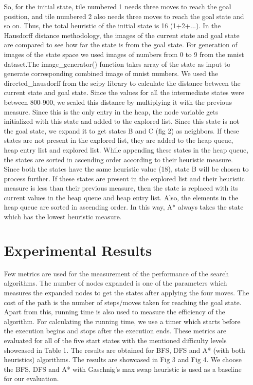 \documentclass{svproc}
\begin{document}
\noindent So, for the initial state, tile numbered 1 needs three moves to reach the goal position, and tile numbered 2 also needs three moves to reach the goal state and so on. Thus, the total heuristic of the initial state is 16 (1+2+...).
\noindent In the Hausdorff distance methodology, the images of the current state and goal state are compared to see how far the state is from the goal state. For generation of images of the state space we used images of numbers from 0 to 9 from the mnist  dataset.The image\_generator() function takes array of the state as input to generate corresponding combined image of mnist numbers. We used the directed\_hausdorff from the scipy library to calculate the distance between the current state and goal state. Since the values for all the intermediate states were between 800-900, we scaled this distance by multiplying it with the previous measure. Since this is the only entry in the heap, the node variable gets initialized with this state and added to the explored list. Since this state is not the goal state, we expand it to get states B and C (fig 2) as neighbors. If these states are not present in the explored list, they are added to the heap queue, heap entry list and explored list. While appending these states in the heap queue, the states are sorted in ascending order according to their heuristic measure. Since both the states have the same heuristic value (18), state B will be chosen to process further. If these states are present in the explored list and their heuristic measure is less than their previous measure, then the state is replaced with its current values in the heap queue and heap entry list. Also, the elements in the heap queue are sorted in ascending order. In this way, A* always takes the state which has the lowest heuristic measure. 

\section{Experimental Results}
\noindent Few metrics are used for the measurement of the performance of the search algorithms. The number of nodes expanded is one of the parameters which measures the  expanded nodes to get the states after applying the four moves. The cost of the path is the number of steps/moves taken for reaching the goal state. Apart from this, running time is also used to measure the efficiency of the algorithm. For calculating the running time, we use a timer which starts before the execution begins and stops after the execution ends. These metrics are evaluated for all of the five start states with the mentioned difficulty levels showcased in Table 1. The results are obtained for BFS, DFS and A* (with both heuristics) algorithms. The results are showcased in Fig 3 and Fig 4. We choose the BFS, DFS and A* with Gaschnig's max swap heuristic is used as a baseline for our evaluation. \\
\end{document}
